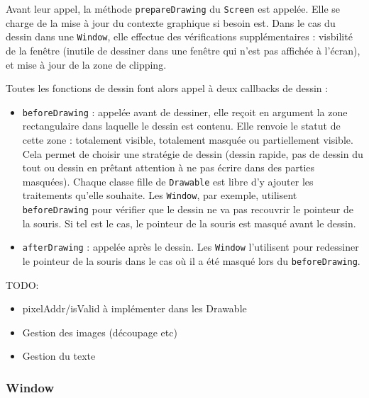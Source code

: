 Avant leur appel, la méthode \verb|prepareDrawing| du \verb|Screen| est appelée. Elle se charge de la mise à jour du contexte graphique si besoin est. Dans le cas du dessin dans une \verb|Window|, elle effectue des vérifications supplémentaires : visbilité de la fenêtre (inutile de dessiner dans une fenêtre qui n'est pas affichée à l'écran), et mise à jour de la zone de clipping.

Toutes les fonctions de dessin font alors appel à deux callbacks de dessin :
\begin{itemize}
  \item \verb|beforeDrawing| : appelée avant de dessiner, elle reçoit en argument la zone rectangulaire dans laquelle le dessin est contenu. Elle renvoie le statut de cette zone : totalement visible, totalement masquée ou partiellement visible. Cela permet de choisir une stratégie de dessin (dessin rapide, pas de dessin du tout ou dessin en prêtant attention à ne pas écrire dans des parties masquées). Chaque classe fille de \verb|Drawable| est libre d'y ajouter les traitements qu'elle souhaite. Les \verb|Window|, par exemple, utilisent \verb|beforeDrawing| pour vérifier que le dessin ne va pas recouvrir le pointeur de la souris. Si tel est le cas, le pointeur de la souris est masqué avant le dessin.
  \item \verb|afterDrawing| : appelée après le dessin. Les \verb|Window| l'utilisent pour redessiner le pointeur de la souris dans le cas où il a été masqué lors du \verb|beforeDrawing|.
\end{itemize}

\vspace{1em}

TODO:
\begin{itemize}
  \item pixelAddr/isValid à implémenter dans les Drawable
  \item Gestion des images (découpage etc)
  \item Gestion du texte
\end{itemize}

\subsubsection{Window}


